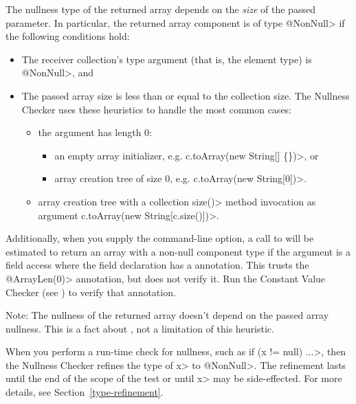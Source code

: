 The nullness type of the
returned array depends on the \emph{size} of the passed parameter. In particular, the
returned array component is of type \<@NonNull> if the following conditions
hold:

\begin{itemize}
  \item The receiver collection's type argument (that is, the element type) is \<@NonNull>, and
  \item The passed array size is less than or equal to the collection size. The
    Nullness Checker uses these heuristics to handle the most common cases:

  \begin{itemize}
    \item the argument has length 0:

      \begin{itemize}
        \item an empty array initializer, e.g. \<c.toArray(new String[] \{\})>, or

        \item array creation tree of size 0, e.g. \<c.toArray(new String[0])>.
      \end{itemize}

    \item array creation tree with a collection \<size()> method invocation as argument
      \<c.toArray(new String[c.size()])>.
  \end{itemize}

\end{itemize}

Additionally, when you supply the  command-line
option, a call to  will be estimated to return an array
with a non-null component type if the argument is a field access where the field
declaration has a 
annotation.
This trusts the \<@ArrayLen(0)> annotation, but does not verify it. Run the
Constant Value Checker (see ) to verify
that annotation.

Note: The nullness of the returned array doesn't depend on the passed array nullness.
This is a fact about
,
not a limitation of this heuristic.



When you perform a run-time check for nullness, such as \<if (x != null)
...>, then the Nullness Checker refines the type of \<x> to
\<@NonNull>.  The refinement lasts until the end of the scope of the test
or until \<x> may be side-effected.  For more details, see
Section~\ref{type-refinement}.



